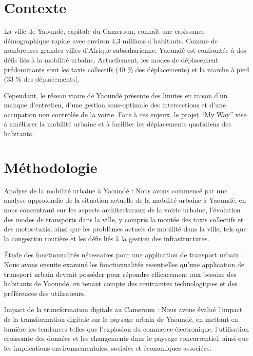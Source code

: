 \documentclass{article}
\begin{document}
\newpage

\section{Contexte}

La ville de Yaoundé, capitale du Cameroun, connaît une croissance démographique rapide avec environ 4,3 millions d’habitants. Comme de nombreuses grandes villes d’Afrique subsaharienne, Yaoundé est confrontée à des défis liés à la mobilité urbaine. Actuellement, les modes de déplacement prédominants sont les taxis collectifs (40 \% des déplacements) et la marche à pied (33 \% des déplacements).

Cependant, le réseau viaire de Yaoundé présente des limites en raison d’un manque d’entretien, d’une gestion sous-optimale des intersections et d’une occupation non contrôlée de la voirie. Face à ces enjeux, le projet “My Way” vise à améliorer la mobilité urbaine et à faciliter les déplacements quotidiens des habitants.

\section{Méthodologie}
 Analyse de la mobilité urbaine à Yaoundé :
Nous avons commencé par une analyse approfondie de la situation actuelle de la mobilité urbaine à Yaoundé, en nous concentrant sur les aspects architecturaux de la voirie urbaine, l'évolution des modes de transports dans la ville, y compris la montée des taxis collectifs et des motos-taxis, ainsi que les problèmes actuels de mobilité dans la ville, tels que la congestion routière et les défis liés à la gestion des infrastructures.

Étude des fonctionnalités nécessaires pour une application de transport urbain :
Nous avons ensuite examiné les fonctionnalités essentielles qu'une application de transport urbain devrait posséder pour répondre efficacement aux besoins des habitants de Yaoundé, en tenant compte des contraintes technologiques et des préférences des utilisateurs.

Impact de la transformation digitale au Cameroun :
Nous avons évalué l'impact de la transformation digitale sur le paysage urbain de Yaoundé, en mettant en lumière les tendances telles que l'explosion du commerce électronique, l'utilisation croissante des données et les changements dans le paysage concurrentiel, ainsi que les implications environnementales, sociales et économiques associées.
\end{document}
